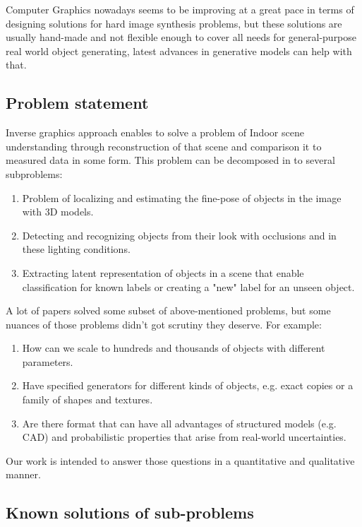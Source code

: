 Computer Graphics nowadays seems to be improving at a great pace in terms of designing solutions for hard image synthesis problems, but these solutions are usually hand-made and not flexible enough to cover all needs for general-purpose real world object generating, latest advances in generative models can help with that.

\subsection{Problem statement}

Inverse graphics approach enables to solve a problem of Indoor scene understanding through reconstruction of that scene and comparison it to measured data in some form. This problem can be decomposed in to several subproblems:

\begin{enumerate}
\item Problem of localizing and estimating the fine-pose of objects in the image with 3D models.
\item Detecting and recognizing objects from their look with occlusions and in these lighting conditions.
\item Extracting latent representation of objects in a scene that enable classification for known labels or creating a "new" label for an unseen object.
\end{enumerate}

A lot of papers solved some subset of above-mentioned problems, but some nuances of those problems didn't got scrutiny they deserve. For example:

\begin{enumerate}
    \item How can we scale to hundreds and thousands of objects with different parameters.
    \item Have specified generators for different kinds of objects, e.g. exact copies or a family of shapes and textures.
    \item Are there format that can have all advantages of structured models (e.g. CAD) and probabilistic properties that arise from real-world uncertainties.
\end{enumerate}

Our work is intended to answer those questions in a quantitative and qualitative manner.

\subsection{Known solutions of sub-problems}


